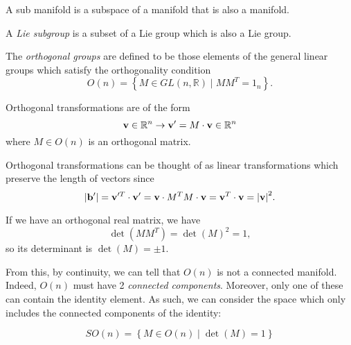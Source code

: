 \begin{definition}[submanifold]
  A sub manifold is a subspace of a manifold that is also a manifold.
\end{definition}

\begin{definition}
  A \emph{Lie subgroup} is a subset of a Lie group which is also a Lie group.
\end{definition}


\begin{definition}
  The \emph{orthogonal groups} are defined to be those elements of the general linear groups which satisfy the orthogonality condition
  \begin{equation}
    O(n) = \left\{ M \in GL(n, \mathbb{R}) \mid M M^T = 1_n \right\}.
  \end{equation}
\end{definition}

\begin{definition}
Orthogonal transformations are of the form
\begin{equation}
  \vb{v} \in \mathbb{R}^n \to \vb{v}' = M \cdot \vb{v} \in \mathbb{R}^n
\end{equation}
  where $M \in O(n)$ is an orthogonal matrix.
\end{definition}

Orthogonal transformations can be thought of as linear transformations which preserve the length of vectors since
\begin{equation}
  \abs{\vb{b}'} = \vb{v}'^T \cdot \vb{v}' = \vb{v} \cdot M^T M \cdot \vb{v} = \vb{v}^T \cdot \vb{v} = \abs{\vb{v}}^2.
\end{equation}

If we have an orthogonal real matrix, we have
\begin{equation}
  \det(M M^T) = \det(M)^2 = 1,
\end{equation}
so its determinant is $\det(M) = \pm 1$.

From this, by continuity, we can tell that $O(n)$ is not a connected manifold. Indeed, $O(n)$ must have 2 \emph{connected components}. Moreover, only one of these can contain the identity element.
As such, we can consider the space which only includes the connected components of the identity:
\begin{definition}
\begin{equation}
  SO(n) = \left\{ M \in O(n) \mid \det(M) = 1 \right\}
\end{equation}
\end{definition}

